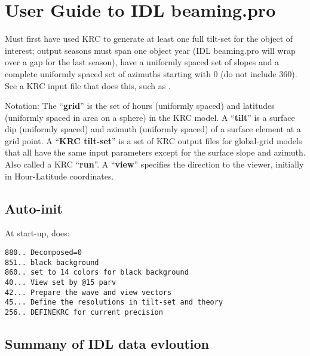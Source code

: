 \documentclass{article}
\begin{document}
\section{User Guide to IDL beaming.pro}
Must first have used KRC to generate at least one full tilt-set for the object
of interest; output seasons must span one object year (IDL beaming.pro will wrap
over a gap for the last season), have a uniformly spaced set of slopes and a
complete uniformly spaced set of azimuths starting with 0 (do not include
360). See a KRC input file that does this, such as  .

Notation:
\qi The ``\textbf{grid}''  is the set of hours (uniformly spaced) and latitudes (uniformly spaced in area on a sphere) in the KRC model.
\qi A ``\textbf{tilt}'' is a surface dip (uniformly spaced) and azimuth (uniformly spaced) of a surface element at a grid point.
\qi A ``\textbf{KRC tilt-set}'' is a set of KRC output files for global-grid models that all have the same input parameters except for the surface slope and azimuth. Also called a KRC  ``\textbf{run}''.
\qi A ``\textbf{view}'' specifies the direction to the viewer, initially in Hour-Latitude coordinates.

\subsection{Auto-init}
At start-up,  does:
\vspace{-3.mm} 
\begin{verbatim}
880.. Decomposed=0
851.. black background
860.. set to 14 colors for black background
40... View set by @15 parv
42... Prepare the wave and view vectors
45... Define the resolutions in tilt-set and theory 
256.. DEFINEKRC for current precision
\end{verbatim} 

\subsection{Summany of IDL  data evloution}
\end{document}
